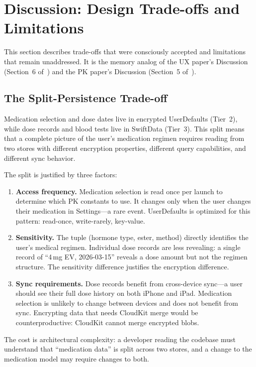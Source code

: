 \documentclass[11pt,a4paper]{article}
\begin{document}
\section{Discussion: Design Trade-offs and Limitations}
\label{sec:discussion}

This section describes trade-offs that were consciously accepted and
limitations that remain unaddressed. It is the memory analog of the UX
paper's Discussion (Section~6 of~\cite{xtux}) and the PK paper's
Discussion (Section~5 of~\cite{xtpk}).

\subsection{The Split-Persistence Trade-off}
\label{sec:split_persistence}

Medication selection and dose dates live in encrypted UserDefaults
(Tier~2), while dose records and blood tests live in SwiftData (Tier~3).
This split means that a complete picture of the user's medication
regimen requires reading from two stores with different encryption
properties, different query capabilities, and different sync behavior.

The split is justified by three factors:

\begin{enumerate}[nosep,leftmargin=1.4em]
\item \textbf{Access frequency.} Medication selection is read once per
  launch to determine which PK constants to use. It changes only when the
  user changes their medication in Settings---a rare event. UserDefaults is
  optimized for this pattern: read-once, write-rarely, key-value.
\item \textbf{Sensitivity.} The tuple (hormone type, ester, method) directly
  identifies the user's medical regimen. Individual dose records are less
  revealing: a single record of ``4\,mg EV, 2026-03-15'' reveals a dose
  amount but not the regimen structure. The sensitivity difference justifies
  the encryption difference.
\item \textbf{Sync requirements.} Dose records benefit from cross-device
  sync---a user should see their full dose history on both iPhone and iPad.
  Medication selection is unlikely to change between devices and does not
  benefit from sync. Encrypting data that needs CloudKit merge would be
  counterproductive: CloudKit cannot merge encrypted blobs.
\end{enumerate}

The cost is architectural complexity: a developer reading the codebase must
understand that ``medication data'' is split across two stores, and a change
to the medication model may require changes to both.
\end{document}

